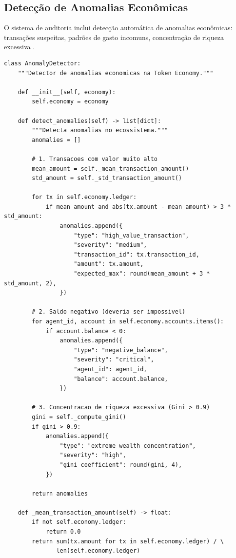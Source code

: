 \subsection{Detecção de Anomalias Econômicas}

O sistema de auditoria inclui detecção automática de anomalias
econômicas: transações suspeitas, padrões de gasto incomuns,
concentração de riqueza excessiva \cite{opencode2026token}.

\begin{lstlisting}[caption={Detector de anomalias economicas},
                  label={lst:anomaly-detector}]
class AnomalyDetector:
    """Detector de anomalias economicas na Token Economy."""

    def __init__(self, economy):
        self.economy = economy

    def detect_anomalies(self) -> list[dict]:
        """Detecta anomalias no ecossistema."""
        anomalies = []

        # 1. Transacoes com valor muito alto
        mean_amount = self._mean_transaction_amount()
        std_amount = self._std_transaction_amount()

        for tx in self.economy.ledger:
            if mean_amount and abs(tx.amount - mean_amount) > 3 * std_amount:
                anomalies.append({
                    "type": "high_value_transaction",
                    "severity": "medium",
                    "transaction_id": tx.transaction_id,
                    "amount": tx.amount,
                    "expected_max": round(mean_amount + 3 * std_amount, 2),
                })

        # 2. Saldo negativo (deveria ser impossivel)
        for agent_id, account in self.economy.accounts.items():
            if account.balance < 0:
                anomalies.append({
                    "type": "negative_balance",
                    "severity": "critical",
                    "agent_id": agent_id,
                    "balance": account.balance,
                })

        # 3. Concentracao de riqueza excessiva (Gini > 0.9)
        gini = self._compute_gini()
        if gini > 0.9:
            anomalies.append({
                "type": "extreme_wealth_concentration",
                "severity": "high",
                "gini_coefficient": round(gini, 4),
            })

        return anomalies

    def _mean_transaction_amount(self) -> float:
        if not self.economy.ledger:
            return 0.0
        return sum(tx.amount for tx in self.economy.ledger) / \
               len(self.economy.ledger)


\end{lstlisting}

